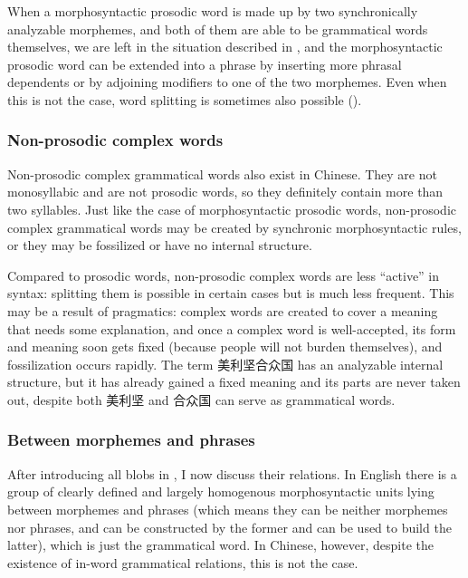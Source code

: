 \documentclass[UTF8, a4paper, oneside, scheme=plain]{ctexrep}
\begin{document}
When a morphosyntactic prosodic word is made up by two synchronically analyzable morphemes,
and both of them are able to be grammatical words themselves,
we are left in the situation described in ,
and the morphosyntactic prosodic word can be extended into a phrase 
by inserting more phrasal dependents 
or by adjoining modifiers to one of the two morphemes.
Even when this is not the case,
word splitting is sometimes also possible 
().

\subsubsection{Non-prosodic complex words}

Non-prosodic complex grammatical words also exist in Chinese.
They are not monosyllabic and are not prosodic words,
so they definitely contain more than two syllables. 
Just like the case of morphosyntactic prosodic words,
non-prosodic complex grammatical words 
may be created by synchronic morphosyntactic rules,
or they may be fossilized or have no internal structure.

Compared to prosodic words,
non-prosodic complex words are less ``active'' in syntax:
splitting them is possible in certain cases
but is much less frequent.
This may be a result of pragmatics:
complex words are created to cover a meaning that needs some explanation,
and once a complex word is well-accepted,
its form and meaning soon gets fixed 
(because people will not burden themselves),
and fossilization occurs rapidly.
The term 美利坚合众国 has an analyzable internal structure,
but it has already gained a fixed meaning 
and its parts are never taken out,
despite both 美利坚 and 合众国 can serve as grammatical words.

\subsubsection{Between morphemes and phrases}

After introducing all blobs in ,
I now discuss their relations.
In English there is a group of clearly defined and largely homogenous morphosyntactic units 
lying between morphemes and phrases
(which means they can be neither morphemes nor phrases,
and can be constructed by the former and can be used to build the latter),
which is just the grammatical word.
In Chinese, however, despite the existence of in-word grammatical relations,
this is not the case.
\end{document}

